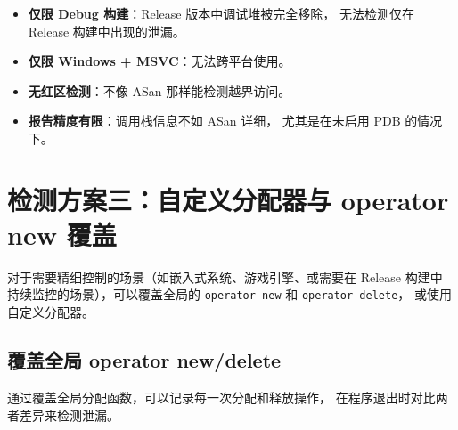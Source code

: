 \documentclass[12pt,a4paper,fontset=fandol]{ctexbook}
\begin{document}
\begin{itemize}[nosep]
  \item \textbf{仅限 Debug 构建}：Release 版本中调试堆被完全移除，
    无法检测仅在 Release 构建中出现的泄漏。
  \item \textbf{仅限 Windows + MSVC}：无法跨平台使用。
  \item \textbf{无红区检测}：不像 ASan 那样能检测越界访问。
  \item \textbf{报告精度有限}：调用栈信息不如 ASan 详细，
    尤其是在未启用 PDB 的情况下。
\end{itemize}


\section{检测方案三：自定义分配器与 operator new 覆盖}

对于需要精细控制的场景（如嵌入式系统、游戏引擎、或需要在 Release 构建中
持续监控的场景），可以覆盖全局的 \texttt{operator new} 和 \texttt{operator delete}，
或使用自定义分配器。

\subsection{覆盖全局 operator new/delete}

通过覆盖全局分配函数，可以记录每一次分配和释放操作，
在程序退出时对比两者差异来检测泄漏。
\end{document}
